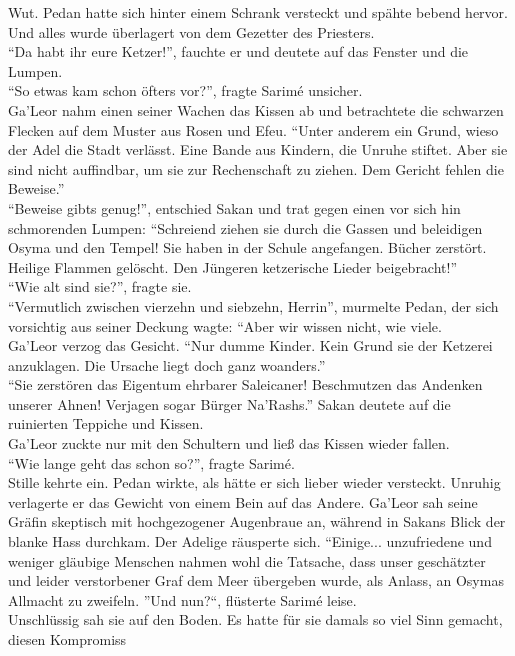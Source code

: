 Wut. Pedan hatte sich hinter einem Schrank versteckt und spähte bebend hervor. Und alles wurde 
überlagert von dem Gezetter des Priesters.\\
``Da habt ihr eure Ketzer!'', fauchte er und deutete auf das Fenster und die Lumpen.\\
``So etwas kam schon öfters vor?'', fragte Sarimé unsicher.\\
Ga'Leor nahm einen seiner Wachen das Kissen ab und betrachtete die schwarzen Flecken auf dem Muster 
aus Rosen und Efeu. ``Unter anderem ein Grund, wieso der Adel die Stadt verlässt. Eine Bande aus 
Kindern, die Unruhe stiftet. Aber sie sind nicht auffindbar, um sie zur Rechenschaft zu ziehen. Dem 
Gericht fehlen die Beweise.''\\
``Beweise gibts genug!'', entschied Sakan und trat gegen einen vor sich hin schmorenden Lumpen: 
``Schreiend ziehen sie durch die Gassen und beleidigen Osyma und den Tempel! Sie haben in der 
Schule angefangen. Bücher zerstört. Heilige Flammen gelöscht. Den Jüngeren ketzerische Lieder 
beigebracht!''\\
``Wie alt sind sie?'', fragte sie.\\
``Vermutlich zwischen vierzehn und siebzehn, Herrin'', murmelte Pedan, der sich vorsichtig aus 
seiner Deckung wagte: ``Aber wir wissen nicht, wie viele.\\
Ga'Leor verzog das Gesicht. ``Nur dumme Kinder. Kein Grund sie der Ketzerei anzuklagen. Die Ursache liegt doch ganz woanders.''\\
``Sie zerstören das Eigentum ehrbarer Saleicaner! Beschmutzen das Andenken unserer Ahnen! Verjagen 
sogar Bürger Na'Rashs.'' Sakan deutete auf die ruinierten Teppiche und Kissen.\\
Ga'Leor zuckte nur mit den Schultern und ließ das Kissen wieder fallen.\\
``Wie lange geht das schon so?'', fragte Sarimé.\\
Stille kehrte ein. Pedan wirkte, als hätte er sich lieber wieder versteckt. Unruhig verlagerte er 
das Gewicht von einem Bein auf das Andere. Ga'Leor sah seine Gräfin skeptisch mit hochgezogener Augenbraue 
an, während in Sakans Blick der blanke Hass durchkam. Der Adelige räusperte sich. ``Einige... unzufriedene und
weniger gläubige Menschen nahmen wohl die Tatsache, dass unser geschätzter und 
leider verstorbener Graf dem Meer übergeben wurde, als Anlass, an Osymas Allmacht zu zweifeln. 
''Und nun?``, flüsterte Sarimé leise.\\
Unschlüssig sah sie auf den Boden. Es hatte für sie damals so viel Sinn gemacht, diesen Kompromiss 
